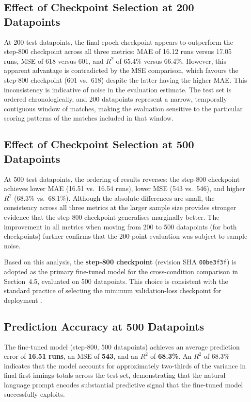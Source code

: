 \subsection{Effect of Checkpoint Selection at 200 Datapoints}

At 200 test datapoints, the final epoch checkpoint appears to outperform the step-800 checkpoint across all three metrics: MAE of 16.12 runs versus 17.05 runs, MSE of 618 versus 601, and $R^2$ of 65.4\% versus 66.4\%. However, this apparent advantage is contradicted by the MSE comparison, which favours the step-800 checkpoint (601 vs.\ 618) despite the latter having the higher MAE. This inconsistency is indicative of noise in the evaluation estimate. The test set is ordered chronologically, and 200 datapoints represent a narrow, temporally contiguous window of matches, making the evaluation sensitive to the particular scoring patterns of the matches included in that window.

\subsection{Effect of Checkpoint Selection at 500 Datapoints}

At 500 test datapoints, the ordering of results reverses: the step-800 checkpoint achieves lower MAE (16.51 vs.\ 16.54 runs), lower MSE (543 vs.\ 546), and higher $R^2$ (68.3\% vs.\ 68.1\%). Although the absolute differences are small, the consistency across all three metrics at the larger sample size provides stronger evidence that the step-800 checkpoint generalises marginally better. The improvement in all metrics when moving from 200 to 500 datapoints (for both checkpoints) further confirms that the 200-point evaluation was subject to sample noise.

Based on this analysis, the \textbf{step-800 checkpoint} (revision SHA \texttt{00be3f3f}) is adopted as the primary fine-tuned model for the cross-condition comparison in Section~4.5, evaluated on 500 datapoints. This choice is consistent with the standard practice of selecting the minimum validation-loss checkpoint for deployment \cite{prechelt1998early}.

\subsection{Prediction Accuracy at 500 Datapoints}

The fine-tuned model (step-800, 500 datapoints) achieves an average prediction error of \textbf{16.51 runs}, an MSE of \textbf{543}, and an $R^2$ of \textbf{68.3\%}. An $R^2$ of 68.3\% indicates that the model accounts for approximately two-thirds of the variance in final first-innings totals across the test set, demonstrating that the natural-language prompt encodes substantial predictive signal that the fine-tuned model successfully exploits.

